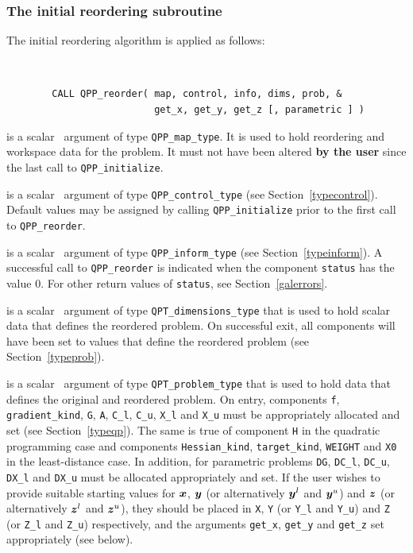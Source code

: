 \documentclass{galahad}
\newcommand{\packagename}{QPP}
\begin{document}
\subsubsection{The initial reordering subroutine}
The initial reordering algorithm is applied as follows: 
\vspace*{-2mm}
{\tt 
\begin{verbatim}
        CALL QPP_reorder( map, control, info, dims, prob, &
                          get_x, get_y, get_z [, parametric ] )
\end{verbatim}
}
\vspace*{-4mm}
\begin{description}
 is a scalar \intentinout\ argument of type 
{\tt \packagename\_map\_type}. 
It is used to hold reordering and workspace data for the problem. 
It must not have been altered {\bf by the user} since the last call
to {\tt \packagename\_initialize}. 
 
 is a scalar \intentin\ argument of type 
{\tt \packagename\_control\_type} 
(see Section~\ref{typecontrol}). 
Default values may be assigned by calling 
{\tt \packagename\_initialize} 
prior to the first call to {\tt \packagename\_reorder}. 
 
 is a scalar \intentout\ argument of type 
{\tt \packagename\_inform\_type} 
(see Section~\ref{typeinform}). 
A successful call to {\tt \packagename\_reor\-der} is indicated 
when the component {\tt status} has the value 0. For other return values 
of {\tt status}, see Section~\ref{galerrors}. 
 
 is a scalar \intentout\ argument of type 
{\tt QPT\_dimensions\_type} that 
is used to hold scalar data that defines the reordered problem. 
On successful exit, all components will have been set to values 
that define the reordered problem (see Section~\ref{typeprob}). 
 
 is a scalar \intentinout\ argument of type 
{\tt QPT\_problem\_type} that 
is used to hold data that defines the original and reordered problem. 
On entry, components {\tt f}, {\tt gradient\_kind}, {\tt G},
{\tt A}, {\tt C\_l}, {\tt C\_u}, {\tt X\_l} and {\tt X\_u} 
must be appropriately allocated and set (see Section~\ref{typeqp}).
The same is true of component {\tt H} in the quadratic programming case
and components {\tt Hessian\_kind}, {\tt target\_kind}, 
{\tt WEIGHT} and {\tt X0} in the least-distance case. 
In addition, for parametric problems
{\tt DG}, {\tt DC\_l}, {\tt DC\_u}, {\tt DX\_l} and {\tt DX\_u}
must be allocated appropriately and set.
If the user wishes to provide suitable starting values for ${\bm{x}}$, ${\bm{y}}$ 
(or alternatively ${\bm{y}}^l$ and ${\bm{y}}^u$) and
${\bm{z}}$ (or alternatively ${\bm{z}}^l$ and ${\bm{z}}^u$), 
they should be placed in {\tt X}, {\tt Y} (or {\tt Y\_l} and {\tt Y\_u})
and {\tt Z} (or {\tt Z\_l} and {\tt Z\_u}) respectively,
and the arguments {\tt get\_x}, {\tt get\_y} and {\tt get\_z}
set appropriately (see below). 


\end{description}
\end{document}

